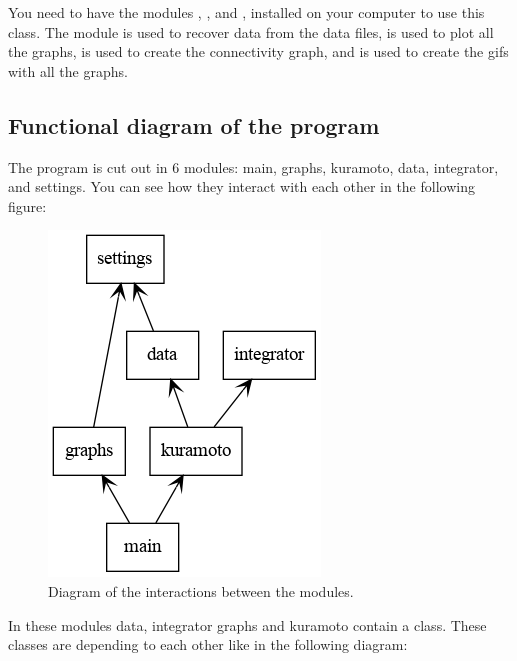 \documentclass[1pt, a4paper]{article}
\begin{document}
\noindent
You need to have the modules , ,  and , installed on your computer to use this class. The module  is used to recover data from the data files,  is used to plot all the graphs,  is used to create the connectivity graph, and  is used to create the gifs with all the graphs.\\
\newpage
\subsection{Functional diagram of the program}
\label{subs:2.4}
The program is cut out in 6 modules: main, graphs, kuramoto, data, integrator, and settings. You can see how they interact with each other in the following figure:
\begin{figure}[htbp]
    \centering
    \includegraphics[scale=0.6]{figures/packages_kuramotoModel.png}
    \caption{Diagram of the interactions between the modules.}
    \label{fig:diagram_module}
\end{figure}
In these modules data, integrator graphs and kuramoto contain a class. These classes are depending to each other like in the following diagram:
\end{document}
